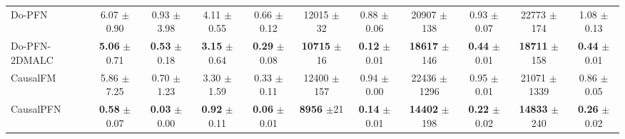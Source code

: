 \documentclass[11pt]{article}
\begin{document}
\begin{table}[t]
{\begin{tabular}{l cc cc cc cc cc}
\midrule[\heavyrulewidth]
Do-PFN
& 6.07 {\scriptsize$\pm$0.90} & 0.93 {\scriptsize$\pm$3.98}
& 4.11 {\scriptsize$\pm$0.55} & 0.66 {\scriptsize$\pm$0.12}
& 12015 {\scriptsize$\pm$32} & 0.88 {\scriptsize$\pm$0.06}
& 20907 {\scriptsize$\pm$138} & 0.93 {\scriptsize$\pm$0.07}
& 22773 {\scriptsize$\pm$174} & 1.08 {\scriptsize$\pm$0.13} \\
Do-PFN-2DMALC & \textbf{5.06} {\scriptsize$\pm$0.71} & \textbf{0.53} {\scriptsize$\pm$0.18}
& \textbf{3.15} {\scriptsize$\pm$0.64} & \textbf{0.29 }{\scriptsize$\pm$0.08}
& \textbf{10715} {\scriptsize$\pm$16} & \textbf{0.12} {\scriptsize$\pm$0.01}
& \textbf{18617} {\scriptsize$\pm$146} & \textbf{0.44} {\scriptsize$\pm$0.01}
& \textbf{18711} {\scriptsize$\pm$158} & \textbf{0.44} {\scriptsize$\pm$0.01} \\
\midrule[\heavyrulewidth]
CausalFM
& 5.86 {\scriptsize$\pm$7.25} & 0.70 {\scriptsize$\pm$1.23}
& 3.30 {\scriptsize$\pm$1.59} & 0.33 {\scriptsize$\pm$0.11}
& 12400 {\scriptsize$\pm$157} & 0.94 {\scriptsize$\pm$0.00}
& 22436 {\scriptsize$\pm$1296} & 0.95 {\scriptsize$\pm$0.01}
& 21071 {\scriptsize$\pm$1339} & 0.86 {\scriptsize$\pm$0.05} \\
CausalPFN
& \textbf{0.58} {\scriptsize$\pm$0.07} & \textbf{0.03} {\scriptsize$\pm$0.00}
& \textbf{0.92} {\scriptsize$\pm$0.11} & \textbf{0.06} {\scriptsize$\pm$0.01}
& \textbf{8956} {\scriptsize$\pm$21} & \textbf{0.14} {\scriptsize$\pm$0.01}
& \textbf{14402} {\scriptsize$\pm$198} & \textbf{0.22} {\scriptsize$\pm$0.02}
& \textbf{14833} {\scriptsize$\pm$240} & \textbf{0.26} {\scriptsize$\pm$0.02} \\
\bottomrule
\end{tabular}%
}
\end{table}
\end{document}
